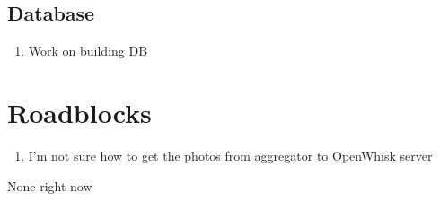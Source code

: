 \documentclass[paper=a4, fontsize=12pt]{scrartcl} %
\numberwithin{equation}{section} %
\numberwithin{figure}{section} %
\numberwithin{table}{section} %
\begin{document}

\subsection{Database}
\begin{enumerate}
\item Work on building DB
\end{enumerate}



\section{Roadblocks}
\begin{enumerate}
\item I'm not sure how to get the photos from aggregator to OpenWhisk server 
\end{enumerate}

None right now
\end{document}

